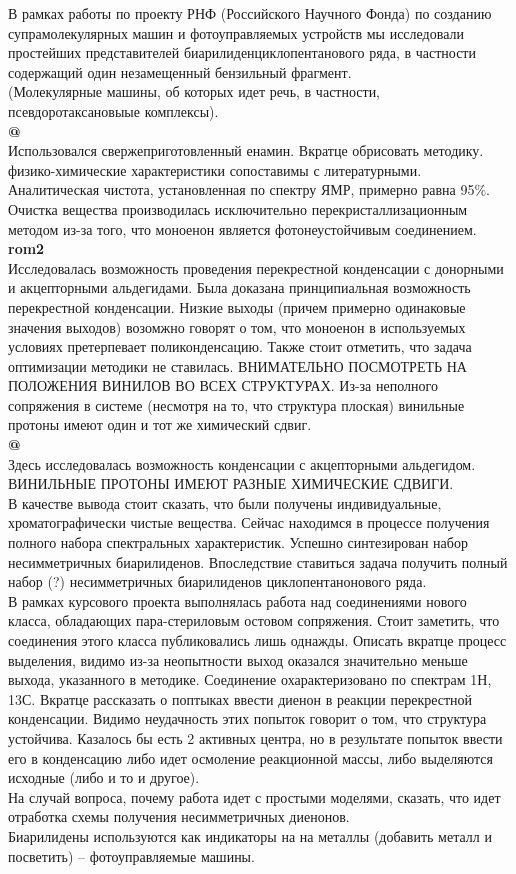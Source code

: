 \documentclass[a4paper]{article}
\makeatletter
\newcommand*{\rom}[1]{\expandafter\@slowromancap\romannumeral #1@}
\makeatother
\begin{document}
В рамках работы по проекту РНФ (Российского Научного Фонда) по созданию супрамолекулярных машин и фотоуправляемых устройств мы исследовали простейших представителей биарилиденциклопентанового ряда, в частности содержащий один незамещенный бензильный фрагмент. \\
(Молекулярные машины, об которых идет речь, в частности, псевдоротаксановыые комплексы).\\
\textbf{\rom{1}} \\
Использовался свержеприготовленный енамин. Вкратце обрисовать методику. физико-химические характеристики сопоставимы с литературными. Аналитическая чистота, установленная по спектру ЯМР, примерно равна 95$\%$. Очистка вещества производилась исключительно перекристаллизационным методом из-за того, что моноенон является фотонеустойчивым соединением.
\textbf{rom{2}} \\
Исследовалась возможность проведения перекрестной конденсации с донорными и акцепторными альдегидами. Была доказана принципиальная возможность перекрестной конденсации. Низкие выходы (причем примерно одинаковые значения выходов) возомжно говорят о том, что моноенон в используемых условиях претерпевает поликонденсацию. Также стоит отметить, что задача оптимизации методики не ставилась.
ВНИМАТЕЛЬНО ПОСМОТРЕТЬ НА ПОЛОЖЕНИЯ ВИНИЛОВ ВО ВСЕХ СТРУКТУРАХ. Из-за неполного сопряжения в системе (несмотря на то, что структура плоская) винильные протоны имеют один и тот же химический сдвиг. \\
\textbf{\rom{3}} \\
Здесь исследовалась возможность конденсации с акцепторными альдегидом. ВИНИЛЬНЫЕ ПРОТОНЫ ИМЕЮТ РАЗНЫЕ ХИМИЧЕСКИЕ СДВИГИ. 
\\
В качестве вывода стоит сказать, что были получены индивидуальные, хроматографически чистые вещества. Сейчас находимся в процессе получения полного набора спектральных характеристик.
Успешно синтезирован набор несимметричных биарилиденов. Впоследствие ставиться задача получить полный набор (?) несимметричных биарилиденов циклопентанонового ряда.
\\
В рамках курсового проекта выполнялась работа над соединениями нового класса, обладающих пара-стериловым остовом сопряжения. Стоит заметить, что соединения этого класса публиковались лишь однажды. Описать вкратце процесс выделения, видимо из-за неопытности выход оказался значительно меньше выхода, указанного в методике. Соединение охарактеризовано по спектрам 1Н, 13С. Вкратце рассказать о поптыках ввести диенон в реакции перекрестной конденсации. Видимо неудачность этих попыток говорит о том, что структура устойчива. Казалось бы есть 2 активных центра, но в результате попыток ввести его в конденсацию либо идет осмоление реакционной массы, либо выделяются исходные (либо и то и другое).
\\
На случай вопроса, почему работа идет с простыми моделями, сказать, что идет отработка схемы получения несимметричных диенонов.\\
Биарилидены используются как индикаторы на на металлы (добавить металл и посветить) -- фотоуправляемые машины. 
\end{document}
